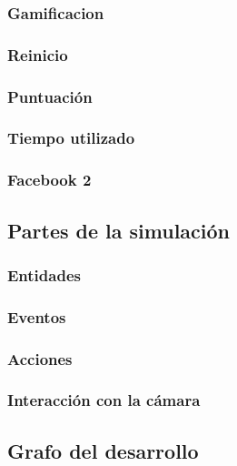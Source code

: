 \subsubsection{Gamificacion}
\subsubsection{Reinicio}
\subsubsection{Puntuación}
\subsubsection{Tiempo utilizado}
\subsubsection{Facebook 2}

\subsection{Partes de la simulación}
    \subsubsection{Entidades}
    \subsubsection{Eventos}
    \subsubsection{Acciones}
    \subsubsection{Interacción con la cámara}

\subsection{Grafo del desarrollo}

